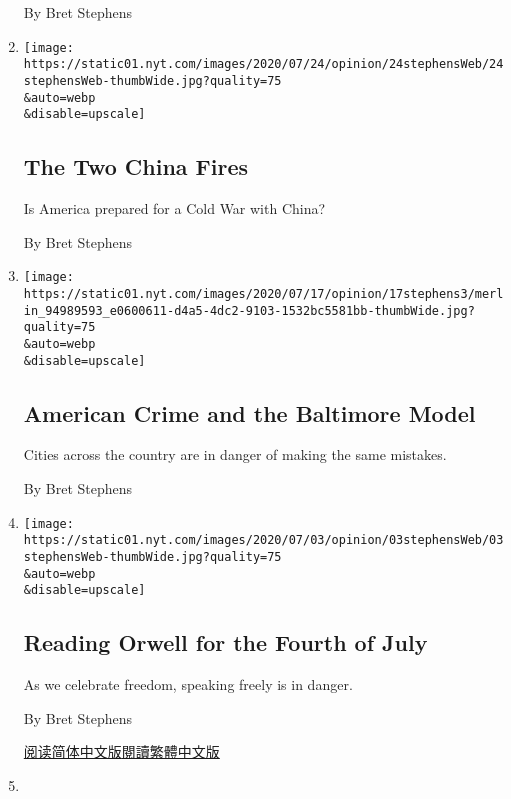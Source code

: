 \begin{enumerate}
  By Bret Stephens
\item
  \href{/2020/07/24/opinion/china-trump.html}{}

  \texttt{[image: https://static01.nyt.com/images/2020/07/24/opinion/24stephensWeb/24stephensWeb-thumbWide.jpg?quality=75\\\&auto=webp\\\&disable=upscale]}

  \hypertarget{the-two-china-fires}{%
  \subsection{The Two China Fires}\label{the-two-china-fires}}

  Is America prepared for a Cold War with China?

  By Bret Stephens
\item
  \href{/2020/07/17/opinion/policing-crime-baltimore.html}{}

  \texttt{[image: https://static01.nyt.com/images/2020/07/17/opinion/17stephens3/merlin\_94989593\_e0600611-d4a5-4dc2-9103-1532bc5581bb-thumbWide.jpg?quality=75\\\&auto=webp\\\&disable=upscale]}

  \hypertarget{american-crime-and-the-baltimore-model}{%
  \subsection{American Crime and the Baltimore
  Model}\label{american-crime-and-the-baltimore-model}}

  Cities across the country are in danger of making the same mistakes.

  By Bret Stephens
\item
  \href{/2020/07/03/opinion/orwell-fourth-of-july.html}{}

  \texttt{[image: https://static01.nyt.com/images/2020/07/03/opinion/03stephensWeb/03stephensWeb-thumbWide.jpg?quality=75\\\&auto=webp\\\&disable=upscale]}

  \hypertarget{reading-orwell-for-the-fourth-of-july}{%
  \subsection{Reading Orwell for the Fourth of
  July}\label{reading-orwell-for-the-fourth-of-july}}

  As we celebrate freedom, speaking freely is in danger.

  By Bret Stephens

  \href{https://cn.nytimes.com/opinion/20200706/orwell-fourth-of-july/}{阅读简体中文版}\href{https://cn.nytimes.com/opinion/20200706/orwell-fourth-of-july/zh-hant/}{閱讀繁體中文版}
\item
  \href{/2020/06/26/opinion/statues-protests.html}{}


\end{enumerate}
